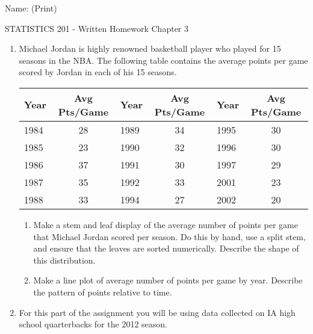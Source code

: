 \documentclass{article}[11pt]
\begin{document}
\hspace{2in} Name: (Print) \underline{\mbox{\hspace{3.5in}}}\\

\begin{center}
{\Large STATISTICS 201 - Written Homework Chapter 3}\\[3mm]
\end{center}

\begin{enumerate}

\item Michael Jordan is highly renowned basketball player who played for 15 seasons in the NBA.  The following table contains the average points per game scored by Jordan in each of his 15 seasons.

\begin{center}
\begin{tabular}{|l|c||l|c||l|c|} \hline
Year & Avg Pts/Game & Year & Avg Pts/Game & Year & Avg Pts/Game 
\\ \hline
1984 & 28 & 1989 & 34 & 1995 & 30 \\
1985 & 23 & 1990 & 32 & 1996 & 30 \\
1986 & 37 & 1991 & 30 & 1997 & 29 \\
1987 & 35 & 1992 & 33 & 2001 & 23 \\
1988 & 33 & 1994 & 27 & 2002 & 20 \\ \hline
\end{tabular}
\end{center}

\begin{enumerate}
\item Make a stem and leaf display of the average number of points per game that Michael Jordan scored per season.  Do this by hand, use a split stem, and ensure that the leaves are sorted numerically. Describe the shape of this distribution. \\

\item Make a line plot of average number of points per game by year. Describe the pattern of points relative to time. \\

\end{enumerate}

\newpage
\item For this part of the assignment you will be using data collected on IA high school quarterbacks for the 2012 season.  


\end{enumerate}
\end{document}
